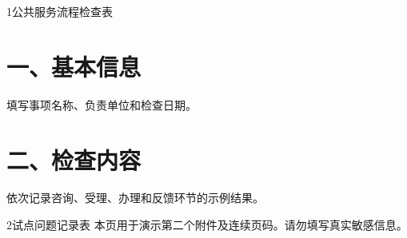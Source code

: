 \documentclass{sysuredhead}
\begin{document}
\RedHeadMakeClosing

\begin{RedHeadAttachment}{1}{公共服务流程检查表}
\section*{一、基本信息}

填写事项名称、负责单位和检查日期。

\section*{二、检查内容}

依次记录咨询、受理、办理和反馈环节的示例结果。
\end{RedHeadAttachment}

\begin{RedHeadAttachment}{2}{试点问题记录表}
本页用于演示第二个附件及连续页码。请勿填写真实敏感信息。
\end{RedHeadAttachment}

\RedHeadMakeImprint
\end{document}
